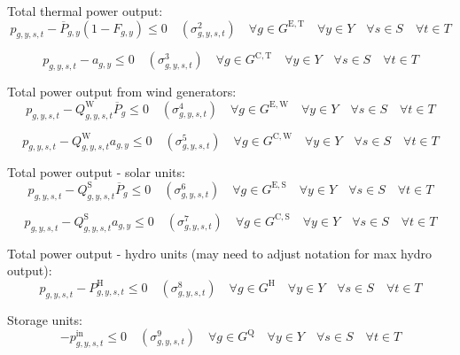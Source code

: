 \documentclass{article}
\newcommand{\sGeneratorsExistingThermal}{G^{\mathrm{E,T}}}
\newcommand{\sGeneratorsExistingWind}{G^{\mathrm{E,W}}}
\newcommand{\sGeneratorsExistingSolar}{G^{\mathrm{E,S}}}
\newcommand{\sGeneratorsCandidateThermal}{G^{\mathrm{C,T}}}
\newcommand{\sGeneratorsCandidateWind}{G^{\mathrm{C,W}}}
\newcommand{\sGeneratorsCandidateSolar}{G^{\mathrm{C,S}}}
\newcommand{\sGeneratorsHydro}{G^{\mathrm{H}}}
\newcommand{\sStorage}{G^{\mathrm{Q}}}
\newcommand{\sYears}{Y}
\newcommand{\sScenarios}{S}
\newcommand{\sIntervals}{T}
\newcommand{\iGenerator}{g}
\newcommand{\iYear}{y}
\newcommand{\iScenario}{s}
\newcommand{\iInterval}{t}
\newcommand{\cPowerOutputMax}[1][\iGenerator,\iYear]{\overline{P}_{#1}}
\newcommand{\cCapacityFactorWind}[1][\iGenerator,\iYear,\iScenario,\iInterval]{Q_{#1}^{\mathrm{W}}}
\newcommand{\cCapacityFactorSolar}[1][\iGenerator,\iYear,\iScenario,\iInterval]{Q_{#1}^{\mathrm{S}}}
\newcommand{\cRetirementIndicator}[1][\iGenerator,\iYear]{F_{#1}}
\newcommand{\cPowerOutputHydro}[1][\iGenerator,\iYear,\iScenario,\iInterval]{P^{\mathrm{H}}_{#1}}
\newcommand{\vPower}[1][\iGenerator,\iYear,\iScenario,\iInterval]{p_{#1}}
\newcommand{\vPowerIn}[1][\iGenerator,\iYear,\iScenario,\iInterval]{p^{\mathrm{in}}_{#1}}
\newcommand{\vInstalledCapacityTotal}[1][\iGenerator,\iYear]{a_{#1}}
\newcommand{\dMaxPowerOutputExistingThermal}[1][\iGenerator,\iYear,\iScenario,\iInterval]{\sigma_{#1}^{2}}
\newcommand{\dMaxPowerOutputCandidateThermal}[1][\iGenerator,\iYear,\iScenario,\iInterval]{\sigma_{#1}^{3}}
\newcommand{\dMaxPowerOutputWindExisting}[1][\iGenerator,\iYear,\iScenario,\iInterval]{\sigma_{#1}^{4}}
\newcommand{\dMaxPowerOutputWindCandidate}[1][\iGenerator,\iYear,\iScenario,\iInterval]{\sigma_{#1}^{5}}
\newcommand{\dMaxPowerOutputSolarExisting}[1][\iGenerator,\iYear,\iScenario,\iInterval]{\sigma_{#1}^{6}}
\newcommand{\dMaxPowerOutputSolarCandidate}[1][\iGenerator,\iYear,\iScenario,\iInterval]{\sigma_{#1}^{7}}
\newcommand{\dMaxPowerOutputHydro}[1][\iGenerator,\iYear,\iScenario,\iInterval]{\sigma_{#1}^{8}}
\newcommand{\dNonNegativeCharging}[1][\iGenerator,\iYear,\iScenario,\iInterval]{\sigma_{#1}^{9}}
\newcommand{\sScenarioSets}{\quad \forall \iYear \in \sYears \quad \forall \iScenario \in \sScenarios \quad \forall \iInterval \in \sIntervals}
\begin{document}
Total thermal power output:
\begin{equation}
	\vPower - \cPowerOutputMax \left(1 - \cRetirementIndicator\right) \leq 0 \quad (\dMaxPowerOutputExistingThermal) \quad \forall \iGenerator \in \sGeneratorsExistingThermal \sScenarioSets
\end{equation}

\begin{equation}
	\vPower - \vInstalledCapacityTotal \leq 0 \quad (\dMaxPowerOutputCandidateThermal) \quad \forall \iGenerator \in \sGeneratorsCandidateThermal \sScenarioSets
\end{equation}

Total power output from wind generators:
\begin{equation}
	\vPower - \cCapacityFactorWind \cPowerOutputMax[\iGenerator] \leq 0 \quad (\dMaxPowerOutputWindExisting) \quad \forall \iGenerator \in \sGeneratorsExistingWind \sScenarioSets
\end{equation}

\begin{equation}
	\vPower - \cCapacityFactorWind \vInstalledCapacityTotal \leq 0 \quad (\dMaxPowerOutputWindCandidate) \quad \forall \iGenerator \in \sGeneratorsCandidateWind \sScenarioSets
\end{equation}

Total power output - solar units:
\begin{equation}
	\vPower - \cCapacityFactorSolar \cPowerOutputMax[\iGenerator] \leq 0 \quad (\dMaxPowerOutputSolarExisting) \quad \forall \iGenerator \in \sGeneratorsExistingSolar \sScenarioSets
\end{equation}

\begin{equation}
	\vPower - \cCapacityFactorSolar \vInstalledCapacityTotal \leq 0 \quad (\dMaxPowerOutputSolarCandidate) \quad \forall \iGenerator \in \sGeneratorsCandidateSolar \sScenarioSets
\end{equation}

Total power output - hydro units (may need to adjust notation for max hydro output):
\begin{equation}
	\vPower - \cPowerOutputHydro \leq 0 \quad (\dMaxPowerOutputHydro) \quad \forall \iGenerator \in \sGeneratorsHydro \sScenarioSets
\end{equation}

Storage units:
\begin{equation}
	-\vPowerIn \leq 0 \quad (\dNonNegativeCharging) \quad \forall \iGenerator \in \sStorage \sScenarioSets
\end{equation}
\end{document}
